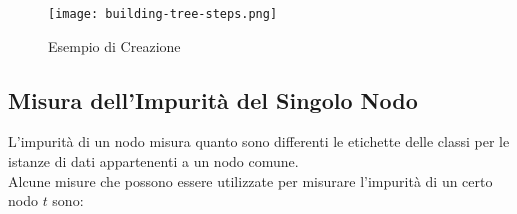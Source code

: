         \clearpage

        \begin{figure}[h]
            \caption{Esempio di Creazione}
            \centering
            \texttt{[image: building-tree-steps.png]}
        \end{figure}

        \clearpage

    \subsection{Misura dell'Impurità del Singolo Nodo}
    L'impurità di un nodo misura quanto sono differenti le etichette delle classi per le istanze di dati appartenenti a un nodo comune.
    \\[1\baselineskip]
    Alcune misure che possono essere utilizzate per misurare l'impurità di un certo nodo $t$ sono:

